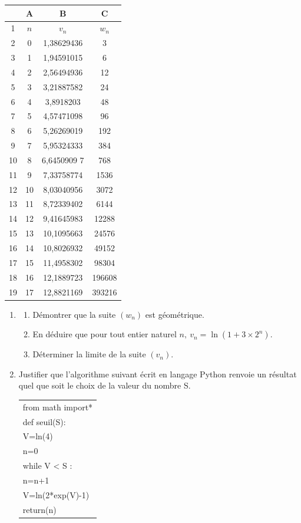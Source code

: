 \documentclass[10pt]{article}
\begin{document}
\begin{minipage}{0.36\linewidth}
{\small\begin{tabular}{c |c|c|c}\hline
	&A &B &C\\ \hline
1 	&$n$&$v_n$& $w_n$\\ \hline
2&0 & 1,38629436 &3\\ \hline
3& 1& 1,94591015 &6\\ \hline
4& 2& 2,56494936 &12\\ \hline
5& 3& 3,21887582 &24\\ \hline
6& 4& 3,8918203 &48\\ \hline
7& 5& 4,57471098 &96\\ \hline
8& 6& 5,26269019 &192\\ \hline
9& 7& 5,95324333 &384\\ \hline
10& 8& 6,6450909 7 &768\\ \hline
11& 9& 7,33758774 &1536\\ \hline
12& 10& 8,03040956 &3072\\ \hline
13& 11& 8,72339402 &6144\\ \hline
14& 12& 9,41645983 &12288\\ \hline
15& 13& 10,1095663 &24576\\ \hline
16& 14& 10,8026932 &49152\\ \hline
17& 15& 11,4958302&98304\\ \hline
18& 16& 12,1889723&196608\\ \hline
19& 17&12,8821169& 393216\\ \hline
\end{tabular}}
\end{minipage}

\begin{enumerate}[start=3]
\item
	\begin{enumerate}
		\item Démontrer que la suite $(w_n)$ est géométrique.
		\item En déduire que pour tout entier naturel $n, \: v_n = \ln \left(1 + 3 \times 2^n\right)$.
		\item Déterminer la limite de la suite $(v_n)$.
	\end{enumerate}
\item Justifier que l'algorithme suivant écrit en langage Python renvoie un résultat quel que soit le choix de la valeur du nombre S.

\begin{center}
\begin{ttfamily}
\begin{tabular}{|l|}\hline
from math import*\\
def seuil(S):\\
\qquad V=ln(4)\\
\qquad n=0\\
\qquad while V < S :\\
\qquad  \quad n=n+1\\
\qquad  \quad V=ln(2*exp(V)-1)\\
\qquad return(n)\\ \hline
\end{tabular}
\end{ttfamily}
\end{center}
\end{enumerate}
\end{document}
